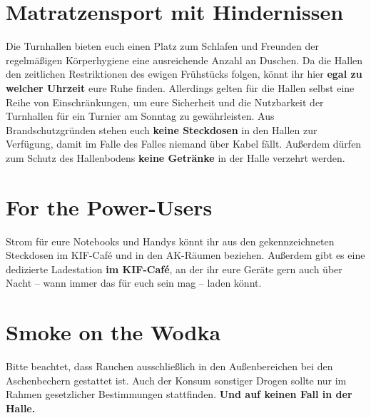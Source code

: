 \section*{Matratzensport mit Hindernissen}

Die Turnhallen bieten euch einen Platz zum Schlafen und Freunden der regelmäßigen Körperhygiene eine ausreichende Anzahl an Duschen.
Da die Hallen den zeitlichen Restriktionen des ewigen Frühstücks folgen, könnt ihr hier \textbf{egal zu welcher Uhrzeit} eure Ruhe finden.
Allerdings gelten für die Hallen selbst eine Reihe von Einschränkungen, um eure Sicherheit und die Nutzbarkeit der Turnhallen für ein Turnier am Sonntag zu gewährleisten.
Aus Brandschutzgründen stehen euch \textbf{keine Steckdosen} in den Hallen zur Verfügung, damit im Falle des Falles niemand über Kabel fällt.
Außerdem dürfen zum Schutz des Hallenbodens \textbf{keine Getränke} in der Halle verzehrt werden.

\section*{For the Power-Users}

Strom für eure Notebooks und Handys könnt ihr aus den gekennzeichneten Steckdosen im KIF-Café und in den AK-Räumen beziehen.
Außerdem gibt es eine dedizierte Ladestation \textbf{im KIF-Café}, an der ihr eure Geräte gern auch über Nacht -- wann immer das für euch sein mag -- laden könnt.

\section*{Smoke on the Wodka}

Bitte beachtet, dass Rauchen ausschließlich in den Außenbereichen bei den Aschenbechern gestattet ist.
Auch der Konsum sonstiger Drogen sollte nur im Rahmen gesetzlicher Bestimmungen stattfinden. \textbf{Und auf keinen Fall in der Halle.}
